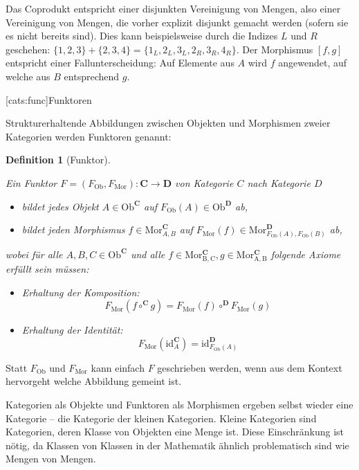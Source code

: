 \documentclass[12pt, a4paper, bibgerm]{scrbook}
\newcommand\lsection{}
\newtheorem{defini}{Definition}
\newcommand{\defi}[2]{%
  \begin{defini}[#1]
    \label{def:#1}
    #2
  \end{defini}
}
\begin{document}
Das Coprodukt entspricht einer disjunkten Vereinigung von Mengen, also
einer Vereinigung von Mengen, die vorher explizit disjunkt gemacht
werden (sofern sie es nicht bereits sind). Dies kann beispielsweise durch
die Indizes $L$ und $R$ geschehen: $\{1,2,3\} + \{2,3,4\} =
\{1_L,2_L,3_L,2_R,3_R,4_R\}$. Der Morphismus $[f,g]$ entspricht einer
Fallunterscheidung: Auf Elemente aus $A$ wird $f$ angewendet, auf welche
aus $B$ entsprechend $g$.

\lsection[cats:func]{Funktoren}

Strukturerhaltende Abbildungen zwischen Objekten und Morphismen zweier
Kategorien werden Funktoren genannt:

\defi{Funktor}{
Ein Funktor $F=(F_{\mathrm{Ob}},F_{\mathrm{Mor}}) : \mathbf{C}
\rightarrow \mathbf{D}$ von Kategorie $C$ nach Kategorie $D$
    \begin{itemize}
    \item bildet jedes Objekt $A \in \mathrm{Ob}^{\mathbf{C}}$ auf $F_{\mathrm{Ob}}(A) \in
      \mathrm{Ob}^{\mathbf{D}}$ ab,
    \item bildet jeden Morphismus $f \in
      \mathrm{Mor}^{\mathbf{C}}_{A,B}$ auf $F_{\mathrm{Mor}}(f) \in
      \mathrm{Mor}^{\mathbf{D}}_{F_{\mathrm{Ob}}(A),F_{\mathrm{Ob}}(B)}$
      ab,
    \end{itemize}
    wobei für alle $A,B,C \in \mathrm{Ob}^{\mathbf{C}}$ und alle $f \in
    \mathrm{Mor^{\mathbf{C}}_{B,C}},g \in
    \mathrm{Mor^{\mathbf{C}}_{A,B}}$ folgende Axiome erfüllt sein
    müssen:
    \begin{itemize}
    \item Erhaltung der Komposition:
      $$F_{\mathrm{Mor}}(f \circ^{\mathbf{C}} g) =
      F_{\mathrm{Mor}}(f) \circ^{\mathbf{D}} F_{\mathrm{Mor}}(g)$$
    \item Erhaltung der Identität:
      $$F_{\mathrm{Mor}}(\mathrm{id}^{\mathbf{C}}_A) =
      \mathrm{id}^{\mathbf{D}}_{F_{\mathrm{Ob}}(A)}$$
    \end{itemize}
}

Statt $F_{\mathrm{Ob}}$ und $F_{\mathrm{Mor}}$ kann einfach $F$
geschrieben werden, wenn aus dem Kontext hervorgeht welche Abbildung
gemeint ist.

Kategorien als Objekte und Funktoren als Morphismen ergeben selbst
wieder eine Kategorie -- die Kategorie der kleinen Kategorien. Kleine
Kategorien sind Kategorien, deren Klasse von Objekten eine Menge
ist. Diese Einschränkung ist nötig, da Klassen von Klassen in der
Mathematik ähnlich problematisch sind wie Mengen von Mengen.
\end{document}
